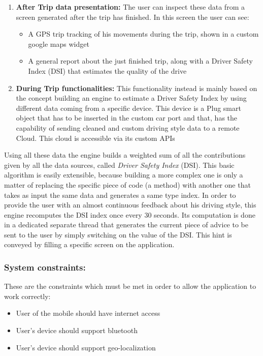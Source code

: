 \begin{enumerate}
	\item \textbf{After Trip data presentation:} The user can inspect these data from a screen generated after the trip 	has finished. In this screen the user can see:
	\begin{itemize}
		\item A GPS trip tracking of his movements during the trip, shown in a custom google maps widget
		\item A general report about the just finished trip, along with a Driver Safety Index (DSI) that estimates the 		quality of the drive
	\end{itemize}
	\item \textbf{During Trip functionalities:} This functionality instead is mainly based on the concept building an engine to estimate a Driver Safety Index by using different data coming from a specific device. This device is a Plug smart object that has to be inserted in the custom car port and that, has the capability of sending cleaned and custom driving style data to a remote Cloud. This cloud is accessible via its custom APIs
\end{enumerate}

Using all these data the engine builds a weighted sum of all the contributions given by all the data sources, called \textit{Driver Safety Index} (DSI). This basic algorithm is easily extensible, because building a more complex one is only a matter of replacing the specific piece of code (a method) with another one that takes as input the same data and generates a same type index.
In order to provide the user with an almost continuous feedback about his driving style, this engine recomputes the DSI index once every 30 seconds. Its computation is done in a dedicated separate thread that generates the current piece of advice to be sent to the user by simply switching on the value of the DSI. This hint is conveyed by filling a specific screen on the application.

\clearpage
\subsubsection{System constraints:}
These are the constraints which must be met in order to allow the application to work correctly:

\begin{itemize}
	\item User of the mobile should have internet access
	\item User's device should support bluetooth
	\item User's device should support geo-localization
\end{itemize}